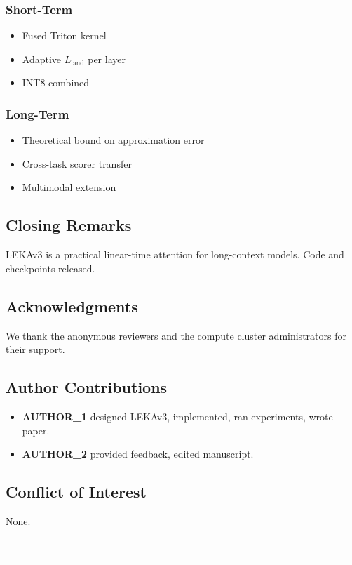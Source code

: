 \subsubsection{Short-Term}
\begin{itemize}
\item Fused Triton kernel
\item Adaptive $L_\text{land}$ per layer
\item INT8 combined

\end{itemize}
\subsubsection{Long-Term}
\begin{itemize}
\item Theoretical bound on approximation error
\item Cross-task scorer transfer
\item Multimodal extension

\end{itemize}
\subsection{Closing Remarks}

LEKAv3 is a practical linear-time attention for long-context models. Code 
and checkpoints released.

\subsection{Acknowledgments}

We thank the anonymous reviewers and the compute cluster administrators for their support.

\subsection{Author Contributions}

\begin{itemize}
\item \textbf{{{AUTHOR\_1}}} designed LEKAv3, implemented, ran experiments, wrote paper.
\item \textbf{{{AUTHOR\_2}}} provided feedback, edited manuscript.

\end{itemize}
\subsection{Conflict of Interest}

None.
\begin{lstlisting}

---
\end{lstlisting}